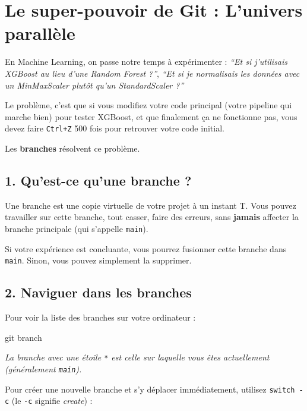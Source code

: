\documentclass[
  letterpaper,
  DIV=11,
  numbers=noendperiod]{scrreprt}
\newenvironment{Shaded}{\begin{snugshade}}{\end{snugshade}}
\newcommand{\FunctionTok}[1]{\textcolor[rgb]{0.28,0.35,0.67}{#1}}
\newcommand{\NormalTok}[1]{\textcolor[rgb]{0.00,0.23,0.31}{#1}}
\begin{document}

\section{Le super-pouvoir de Git : L'univers
parallèle}\label{le-super-pouvoir-de-git-lunivers-paralluxe8le}

En Machine Learning, on passe notre temps à expérimenter : \emph{``Et si
j'utilisais XGBoost au lieu d'une Random Forest ?''}, \emph{``Et si je
normalisais les données avec un MinMaxScaler plutôt qu'un StandardScaler
?''}

Le problème, c'est que si vous modifiez votre code principal (votre
pipeline qui marche bien) pour tester XGBoost, et que finalement ça ne
fonctionne pas, vous devez faire \texttt{Ctrl+Z} 500 fois pour retrouver
votre code initial.

Les \textbf{branches} résolvent ce problème.

\subsection{1. Qu'est-ce qu'une branche ?}\label{quest-ce-quune-branche}

Une branche est une copie virtuelle de votre projet à un instant T. Vous
pouvez travailler sur cette branche, tout casser, faire des erreurs,
sans \textbf{jamais} affecter la branche principale (qui s'appelle
\texttt{main}).

Si votre expérience est concluante, vous pourrez fusionner cette branche
dans \texttt{main}. Sinon, vous pouvez simplement la supprimer.

\subsection{2. Naviguer dans les
branches}\label{naviguer-dans-les-branches}

Pour voir la liste des branches sur votre ordinateur :

\begin{Shaded}
\begin{Highlighting}[]
\FunctionTok{git}\NormalTok{ branch}
\end{Highlighting}
\end{Shaded}

\emph{La branche avec une étoile \texttt{*} est celle sur laquelle vous
êtes actuellement (généralement \texttt{main}).}

Pour créer une nouvelle branche et s'y déplacer immédiatement, utilisez
\texttt{switch\ -c} (le \texttt{-c} signifie \emph{create}) :
\end{document}
